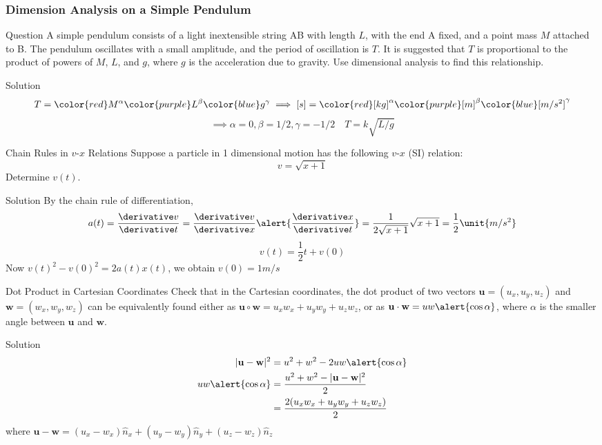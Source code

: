 \begin{frame}
\frametitle{Dimension Analysis on a Simple Pendulum}
\begin{block}{Question}
A \alert{simple} pendulum consists of a \alert{light inextensible} string AB with length $L$, with the end A fixed, and a point mass $M$ attached to B. The pendulum oscillates with a \alert{small} amplitude, and the \alert{period} of oscillation is $T$. It is suggested that $T$ is proportional to the product of powers of $M$, $L$, and $g$, where $g$ is the \alert{acceleration} due to \alert{gravity}. Use \alert{dimensional analysis} to find this relationship.
\end{block}
\begin{block}{Solution}
\[T={\color{red}M^\alpha}{\color{purple} L^\beta}{\color{blue} g^\gamma}\implies{[s]=\color{red}[kg]^\alpha}{\color{purple} [m]^\beta}{\color{blue} [m/s^2]^\gamma}\]\[\implies \alpha=0,\beta=1/2,\gamma=-1/2\quad T=k\sqrt{L/g}\]
\end{block}
\end{frame}
\begin{frame}
\begin{block}{Chain Rules in $v$-$x$ Relations}
Suppose a particle in 1 dimensional motion has the following $v$-$x$ (SI) relation:
\[
v=\sqrt{x+1}
\]
Determine $v(t)$.
\end{block}
\begin{block}{Solution}
By the \alert{chain rule} of differentiation,
\[
a(t)=\frac{\derivative v}{\derivative t}=\frac{\derivative v}{\derivative x}\alert{\frac{\derivative x}{\derivative t}}=\frac{1}{2\sqrt{x+1}}\sqrt{x+1}=\frac{1}{2}\unit{m/s^{2}}
\]
\[
v(t)=\frac{1}{2}t+v(0)
\]
Now \alert{$v(t)^{2}-v(0)^{2}=2a(t)x(t)$}, we obtain $v(0)=1\unit{m/s}$
\end{block}
\end{frame}
\begin{frame}
\begin{block}{Dot Product in Cartesian Coordinates}
Check that in the \alert{Cartesian coordinates}, the \alert{dot product} of two vectors $\mathbf{u}=(u_{x},u_{y},u_{z})$ and $\mathbf{w}=(w_{x},w_{y},w_{z})$ can be \alert{equivalently} found either as $\mathbf{u}\circ\mathbf{w}=u_{x}w_{x}+u_{y}w_{y}+u_{z}w_{z}$, or as $\mathbf{u}\cdot \mathbf{w}=uw\alert{\cos\alpha}$, where $\alpha$ is the smaller angle between $\mathbf{u}$ and $\mathbf{w}$.
\end{block}
\begin{block}{Solution}
\begin{align*}|\mathbf{u}-\mathbf{w}|^{2}&=u^{2}+w^{2}-2uw\alert{\cos\alpha}\\
uw\alert{\cos\alpha}&=\frac{u^{2}+w^{2}-|\mathbf{u}-\mathbf{w}|^{2}}{2}\\&=\frac{2(u_{x}w_{x}+u_{y}w_{y}+u_{z}w_{z})}{2}\end{align*}
where $\mathbf{u}-\mathbf{w}=(u_{x}-w_{x})\hat{n}_x+(u_{y}-w_{y})\hat{n}_y+(u_z-w_z)\hat{n}_z$
\end{block}
\end{frame}

